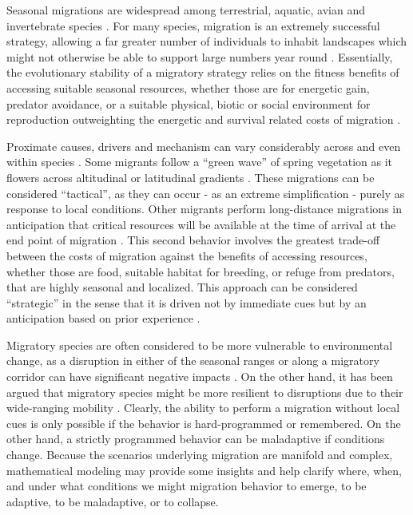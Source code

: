 \documentclass[utf8]{frontiersSCNS} %
\begin{document}
Seasonal migrations are widespread among terrestrial, aquatic, avian and invertebrate species \citep{Dingle2014}. For many species, migration is an extremely successful strategy, allowing a far greater number of individuals to inhabit landscapes which might not otherwise be able to support large numbers year round \citep{Fryxell1988}. Essentially, the evolutionary stability of a migratory strategy relies on the fitness benefits of accessing suitable seasonal resources, whether those are for energetic gain, predator avoidance, or a suitable physical, biotic or social environment for reproduction outweighting the energetic and survival related costs of migration \citep{Avgar2014}. 

Proximate causes, drivers and mechanism can vary considerably across and even within species \citep{Berthold1999, Shaw2016}. Some migrants follow a ``green wave'' of spring vegetation as it flowers across altitudinal or latitudinal gradients \citep{Bischof2012, Kolzsch2015}. These migrations can be considered ``tactical'', as they can occur - as an extreme simplification - purely as response to local conditions. Other migrants perform long-distance migrations in anticipation that critical resources will be available at the time of arrival at the end point of migration \citep{Abrahms2019}. This second behavior involves the greatest trade-off between the costs of migration against the benefits of accessing resources, whether those are food, suitable habitat for breeding, or refuge from predators, that are highly seasonal and localized. This approach can be considered ``strategic'' in the sense that it is driven not by immediate cues but by an anticipation based on prior experience \citep{Bracis2017}.

Migratory species are often considered to be more vulnerable to environmental change, as a disruption in either of the seasonal ranges or along a migratory corridor can have significant negative impacts \citep{Wilcove2008, Kauffman2021}. On the other hand, it has been argued that migratory species might be more resilient to disruptions due to their wide-ranging mobility \citep{Robinson2009}. Clearly, the ability to perform a migration without local cues is only possible if the behavior is hard-programmed or remembered. On the other hand, a strictly programmed behavior can be maladaptive if conditions change. Because the scenarios underlying migration are manifold and complex, mathematical modeling may provide some insights and help clarify where, when, and under what conditions we might migration behavior to emerge, to be adaptive, to be maladaptive, or to collapse.
\end{document}
